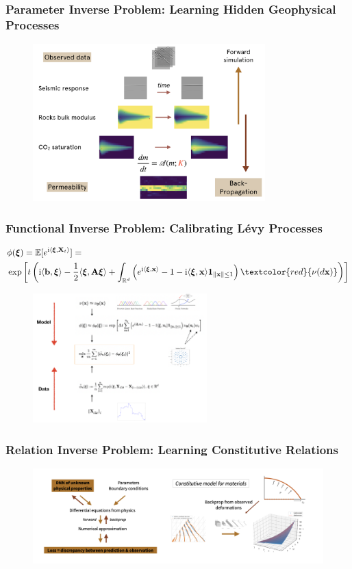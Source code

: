 \documentclass{beamer}
\newcommand{\bx}{\mathbf{x}}
\newcommand{\ii}{\mathrm{i}}
\newcommand{\bxi}{\bm{\xi}}
\newcommand{\bb}{\mathbf{b}}
\newcommand{\bA}{\mathbf{A}}
\newcommand{\bX}{\mathbf{X}}
\newcommand{\red}[1]{\textcolor{red}{#1}}
\newcommand{\RR}[0]{\mathbb{R}}
\begin{document}
\begin{frame}
	\frametitle{Parameter Inverse Problem: Learning Hidden Geophysical Processes}
	\begin{figure}[hbt]
  \includegraphics[width=0.8\textwidth]{../geo.png}
\end{figure}
\end{frame}

\begin{frame}
	\frametitle{Functional Inverse Problem: Calibrating L\'evy Processes}
	{\small
	\begin{align*}
		 		& \phi(\bm{\bxi}) = \mathbb{E}[e^{\ii \langle \bxi, \bX_t \rangle}]= \\
		 		& \exp\left[t\left( \ii \langle \bb, \bxi \rangle - \frac{1}{2}\langle \bxi, \bA\bxi\rangle  +\int_{\RR^d} \left( e^{\ii \langle \bxi, \bx\rangle} - 1 - \ii \langle \bxi, \bx\rangle \mathbf{1}_{\|\bx\|\leq 1}\right)\red{\nu(d\bx)}\right) \right]
		 	\end{align*}
		 	}
	\begin{figure}[hbt]
	 \includegraphics[width=0.6\textwidth]{../algo.png}
\end{figure}
\end{frame}

\begin{frame}
	\frametitle{Relation Inverse Problem: Learning Constitutive Relations}
		\begin{figure}[hbt]
	 \includegraphics[width=1.0\textwidth]{../law.png}
\end{figure}
\end{frame}
\end{document}
